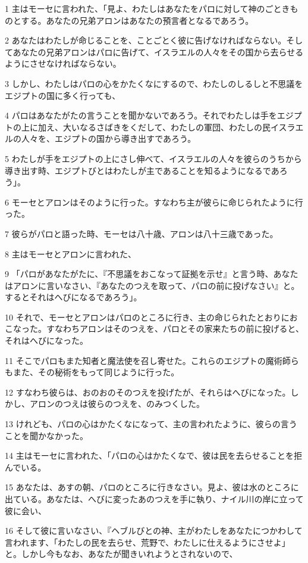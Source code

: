 \par 1 主はモーセに言われた、「見よ、わたしはあなたをパロに対して神のごときものとする。あなたの兄弟アロンはあなたの預言者となるであろう。
\par 2 あなたはわたしが命じることを、ことごとく彼に告げなければならない。そしてあなたの兄弟アロンはパロに告げて、イスラエルの人々をその国から去らせるようにさせなければならない。
\par 3 しかし、わたしはパロの心をかたくなにするので、わたしのしるしと不思議をエジプトの国に多く行っても、
\par 4 パロはあなたがたの言うことを聞かないであろう。それでわたしは手をエジプトの上に加え、大いなるさばきをくだして、わたしの軍団、わたしの民イスラエルの人々を、エジプトの国から導き出すであろう。
\par 5 わたしが手をエジプトの上にさし伸べて、イスラエルの人々を彼らのうちから導き出す時、エジプトびとはわたしが主であることを知るようになるであろう」。
\par 6 モーセとアロンはそのように行った。すなわち主が彼らに命じられたように行った。
\par 7 彼らがパロと語った時、モーセは八十歳、アロンは八十三歳であった。
\par 8 主はモーセとアロンに言われた、
\par 9 「パロがあなたがたに、『不思議をおこなって証拠を示せ』と言う時、あなたはアロンに言いなさい、『あなたのつえを取って、パロの前に投げなさい』と。するとそれはへびになるであろう」。
\par 10 それで、モーセとアロンはパロのところに行き、主の命じられたとおりにおこなった。すなわちアロンはそのつえを、パロとその家来たちの前に投げると、それはへびになった。
\par 11 そこでパロもまた知者と魔法使を召し寄せた。これらのエジプトの魔術師らもまた、その秘術をもって同じように行った。
\par 12 すなわち彼らは、おのおのそのつえを投げたが、それらはへびになった。しかし、アロンのつえは彼らのつえを、のみつくした。
\par 13 けれども、パロの心はかたくなになって、主の言われたように、彼らの言うことを聞かなかった。
\par 14 主はモーセに言われた、「パロの心はかたくなで、彼は民を去らせることを拒んでいる。
\par 15 あなたは、あすの朝、パロのところに行きなさい。見よ、彼は水のところに出ている。あなたは、へびに変ったあのつえを手に執り、ナイル川の岸に立って彼に会い、
\par 16 そして彼に言いなさい、『ヘブルびとの神、主がわたしをあなたにつかわして言われます、「わたしの民を去らせ、荒野で、わたしに仕えるようにさせよ」と。しかし今もなお、あなたが聞きいれようとされないので、
